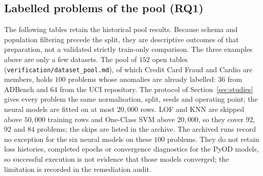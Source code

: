 \documentclass[conference]{IEEEtran}
\begin{document}
\subsection{Labelled problems of the pool (RQ1)}
\label{sec:labelled}
The following tables retain the historical pool results. Because schema and
population filtering precede the split, they are descriptive outcomes of that
preparation, not a validated strictly train-only comparison.
The three examples above are only a few datasets. The pool of $152$ open
tables (\texttt{verification/dataset\_pool.md}), of which Credit Card Fraud and Cardio are members, holds $100$ problems whose
anomalies are already labelled: $36$ from ADBench and $64$ from the UCI
repository. The protocol of Section~\ref{sec:studies} gives every problem the same normalisation,
split, seeds and operating point; the neural models are fitted on at most $20{,}000$ rows. LOF and KNN are skipped above $50{,}000$ training rows
and One-Class SVM above $20{,}000$, so they cover $92$, $92$ and $84$ problems; the
skips are listed in the archive. The archived runs record no exception for the
six neural models on these $100$ problems. They do not retain loss histories,
completed epochs or convergence diagnostics for the PyOD models, so successful
execution is not evidence that those models converged; the limitation is
recorded in the remediation audit.
\end{document}
